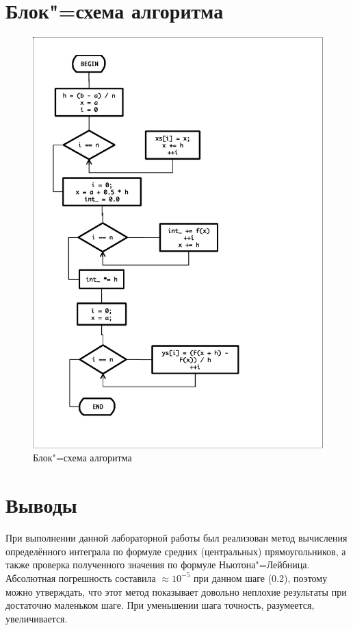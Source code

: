 \documentclass[a4paper,12pt,notitlepage,headsepline,pdftex]{scrartcl}
\begin{document}
\section{Блок"=схема алгоритма}
  \begin{figure}[h!]
    \begin{center}
      \includegraphics[scale=0.60]{flowchart.eps}
    \end{center}
    \caption{Блок"=схема алгоритма}
    \label{fig:flowchart}
  \end{figure}
  \newpage
\section{Выводы}
  При выполнении данной лабораторной работы был реализован метод вычисления
  определённого интеграла по формуле средних (центральных) прямоугольников, а
  также проверка полученного значения по формуле Ньютона"=Лейбница.
  Абсолютная погрешность составила $\approx 10^{-5}$ при данном шаге (0.2),
  поэтому можно утверждать, что этот метод показывает довольно неплохие
  результаты при достаточно маленьком шаге.
  При уменьшении шага точность, разумеется, увеличивается.
\end{document}
